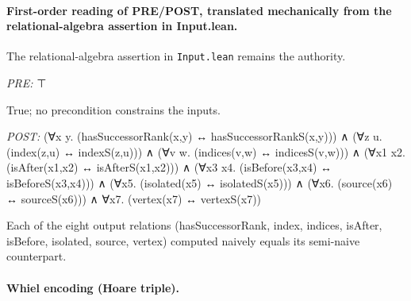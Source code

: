 \documentclass[10pt]{article}
\begin{document}
\paragraph{First-order reading of PRE/POST, translated mechanically from the relational-algebra assertion in Input.lean.} The relational-algebra assertion in \texttt{Input.lean} remains the authority.

\textit{PRE:} ⊤\par True; no precondition constrains the inputs.

\textit{POST:} (∀x y. (hasSuccessorRank(x,y) ↔ hasSuccessorRankS(x,y))) ∧ (∀z u. (index(z,u) ↔ indexS(z,u))) ∧ (∀v w. (indices(v,w) ↔ indicesS(v,w))) ∧ (∀x1 x2. (isAfter(x1,x2) ↔ isAfterS(x1,x2))) ∧ (∀x3 x4. (isBefore(x3,x4) ↔ isBeforeS(x3,x4))) ∧ (∀x5. (isolated(x5) ↔ isolatedS(x5))) ∧ (∀x6. (source(x6) ↔ sourceS(x6))) ∧ ∀x7. (vertex(x7) ↔ vertexS(x7))\par Each of the eight output relations (hasSuccessorRank, index, indices, isAfter, isBefore, isolated, source, vertex) computed naively equals its semi-naive counterpart.

\paragraph{Whiel encoding (Hoare triple).}
\end{document}
